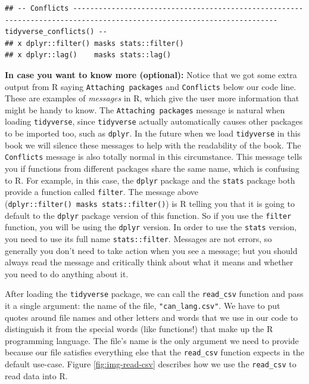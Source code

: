 \documentclass[
  12pt,
]{krantz}
\renewenvironment{quote}{\begin{VF}}{\end{VF}}
\begin{document}
\begin{verbatim}
## -- Conflicts ---------------------------------------------------------------------------------------------------------------------- tidyverse_conflicts() --
## x dplyr::filter() masks stats::filter()
## x dplyr::lag()    masks stats::lag()
\end{verbatim}

\begin{quote}
\textbf{In case you want to know more (optional):} Notice that we got some extra
output from R saying \texttt{Attaching\ packages} and \texttt{Conflicts} below our code
line. These are examples of \emph{messages} in R, which give the user more
information that might be handy to know. The \texttt{Attaching\ packages} message is
natural when loading \texttt{tidyverse}, since \texttt{tidyverse} actually automatically
causes other packages to be imported too, such as \texttt{dplyr}. In the future
when we load \texttt{tidyverse} in this book we will silence these messages to help
with the readability of the book. The \texttt{Conflicts} message is also totally normal
in this circumstance. This message tells you if functions from different
packages share the same name, which is confusing to R. For example, in this
case, the \texttt{dplyr} package and the \texttt{stats} package both provide a function
called \texttt{filter}. The message above (\texttt{dplyr::filter()\ masks\ stats::filter()})
is R telling you that it is going to default to the \texttt{dplyr} package version
of this function. So if you use the \texttt{filter} function, you will be using the
\texttt{dplyr} version. In order to use the \texttt{stats} version, you need to use its
full name \texttt{stats::filter}. Messages are not errors, so generally you don't
need to take action when you see a message; but you should always read the message
and critically think about what it means and whether you need to do anything
about it.
\end{quote}

After loading the \texttt{tidyverse} package, we can call the \texttt{read\_csv} function and
pass it a single argument: the name of the file, \texttt{"can\_lang.csv"}. We have to
put quotes around file names and other letters and words that we use in our
code to distinguish it from the special words (like functions!) that make up the R programming
language. The file's name is the only argument we need to provide because our
file satisfies everything else that the \texttt{read\_csv} function expects in the default
use-case. Figure \ref{fig:img-read-csv} describes how we use the \texttt{read\_csv}
to read data into R.
\end{document}
